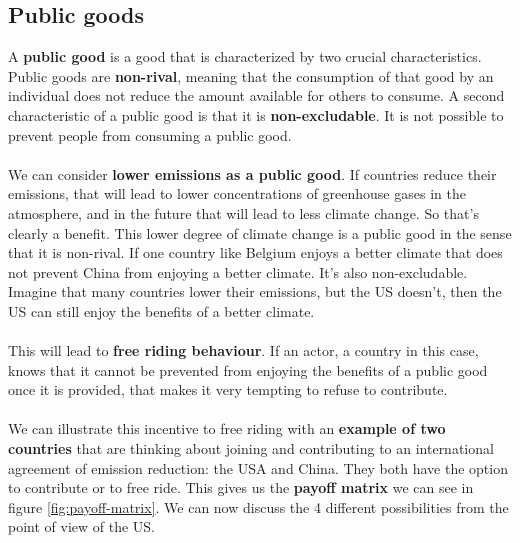 \documentclass[../summary.tex]{subfiles}
\begin{document}
	\newpage
	 \subsection{Public goods}
	 
	A \textbf{public good} is a good that is characterized by two crucial characteristics. Public goods are \textbf{non-rival}, meaning that the consumption of that good by an individual does not reduce the amount available for others to consume. A second characteristic of a public good is that it is \textbf{non-excludable}. It is not possible to prevent people from consuming a public good. 
	\\\\
	We can consider \textbf{lower emissions as a public good}. If countries reduce their emissions, that will lead to lower concentrations of greenhouse gases in the atmosphere, and in the future that will lead to less climate change. So that's clearly a benefit. This lower degree of climate change is a public good in the sense that it is non-rival. If one country like Belgium enjoys a better climate that does not prevent China from enjoying a better climate. It's also non-excludable. Imagine that many countries lower their emissions, but the US doesn't, then the US can still enjoy the benefits of a better climate.
	\\\\
	This will lead to \textbf{free riding behaviour}. If an actor, a country in this case, knows that it cannot be prevented from enjoying the benefits of a public good once it is provided, that makes it very tempting to refuse to contribute. 
	\\\\
	We can illustrate this incentive to free riding with an \textbf{example of two countries} that are thinking about joining and contributing to an international agreement of emission reduction: the USA and China. They both have the option to contribute or to free ride. This gives us the \textbf{payoff matrix} we can see in figure \ref{fig:payoff-matrix}. We can now discuss the 4 different possibilities from the point of view of the US.
\end{document}
